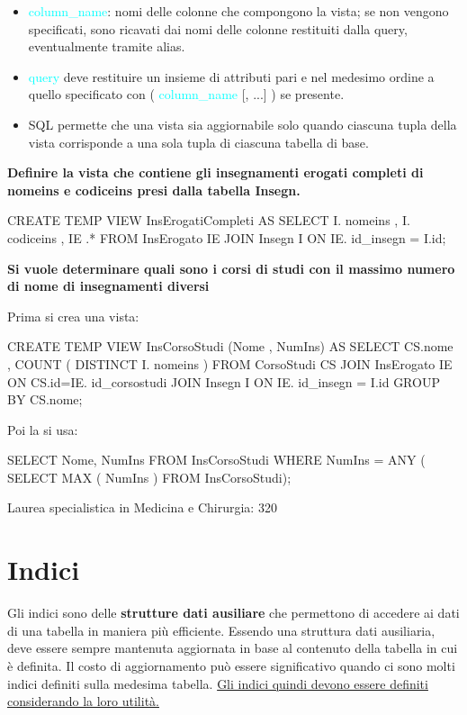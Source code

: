 \begin{itemize}
  \item  \textcolor{cyan}{column\_name}: nomi delle colonne che compongono la vista; se non 
vengono specificati, sono ricavati dai nomi delle colonne restituiti dalla 
query, eventualmente tramite alias.
\item \textcolor{cyan}{query} deve restituire un insieme di attributi pari e nel medesimo ordine a 
quello specificato con ( \textcolor{cyan}{column\_name} [, ...] ) se presente.
\item SQL permette che una vista sia aggiornabile solo quando ciascuna tupla
della vista corrisponde a una sola tupla di ciascuna tabella di base.

\end{itemize}


\textbf{\large Definire la vista che contiene gli insegnamenti erogati completi di nomeins e codiceins
presi dalla tabella Insegn.}

\begin{codiceSQL}
  CREATE TEMP VIEW InsErogatiCompleti AS
SELECT I. nomeins , I. codiceins , IE .*
FROM InsErogato IE
JOIN Insegn I ON IE. id_insegn = I.id;
\end{codiceSQL}


\textbf{\large Si vuole determinare quali sono i corsi di studi con il massimo numero di nome di insegnamenti 
diversi}

Prima si crea una vista:

\begin{codiceSQL}
  CREATE TEMP VIEW InsCorsoStudi (Nome , NumIns) AS
SELECT CS.nome , COUNT ( DISTINCT I. nomeins )
FROM CorsoStudi CS
JOIN InsErogato IE ON CS.id=IE. id_corsostudi
JOIN Insegn I ON IE. id_insegn = I.id 
GROUP BY CS.nome;

\end{codiceSQL}

Poi la si usa:

\begin{codiceSQL}
  SELECT Nome, NumIns
FROM InsCorsoStudi
WHERE NumIns = ANY (
SELECT MAX ( NumIns ) FROM InsCorsoStudi);
\end{codiceSQL}

Laurea specialistica in Medicina e Chirurgia: 320

\section{Indici}

Gli indici sono delle \textbf{strutture dati ausiliare} che permettono di accedere ai dati di una tabella in maniera più efficiente.
Essendo una struttura dati ausiliaria, deve essere sempre mantenuta aggiornata in base al contenuto della tabella in cui è definita.
Il costo di aggiornamento può essere significativo quando ci sono molti indici definiti sulla medesima tabella.
\underline{Gli indici quindi devono essere definiti considerando la loro utilità.}


